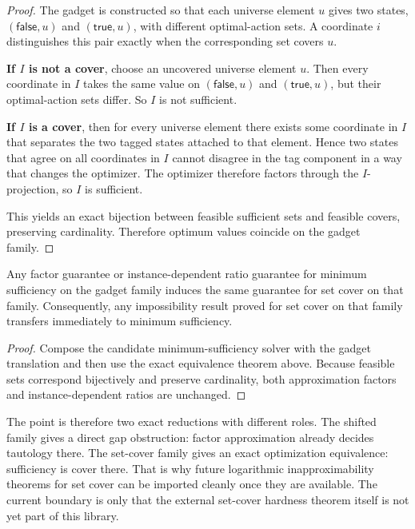 \begin{proof}
The gadget is constructed so that each universe element $u$ gives two states, $(\mathsf{false},u)$ and $(\mathsf{true},u)$, with different optimal-action sets. A coordinate $i$ distinguishes this pair exactly when the corresponding set covers $u$.

\textbf{If $I$ is not a cover}, choose an uncovered universe element $u$. Then every coordinate in $I$ takes the same value on $(\mathsf{false},u)$ and $(\mathsf{true},u)$, but their optimal-action sets differ. So $I$ is not sufficient.

\textbf{If $I$ is a cover}, then for every universe element there exists some coordinate in $I$ that separates the two tagged states attached to that element. Hence two states that agree on all coordinates in $I$ cannot disagree in the tag component in a way that changes the optimizer. The optimizer therefore factors through the $I$-projection, so $I$ is sufficient.

This yields an exact bijection between feasible sufficient sets and feasible covers, preserving cardinality. Therefore optimum values coincide on the gadget family.
\end{proof}

\begin{corollary}
Any factor guarantee or instance-dependent ratio guarantee for minimum sufficiency on the gadget family induces the same guarantee for set cover on that family. Consequently, any impossibility result proved for set cover on that family transfers immediately to minimum sufficiency.
\end{corollary}

\begin{proof}
Compose the candidate minimum-sufficiency solver with the gadget translation and then use the exact equivalence theorem above. Because feasible sets correspond bijectively and preserve cardinality, both approximation factors and instance-dependent ratios are unchanged.
\end{proof}

The point is therefore two exact reductions with different roles. The shifted family gives a direct gap obstruction: factor approximation already decides tautology there. The set-cover family gives an exact optimization equivalence: sufficiency is cover there. That is why future logarithmic inapproximability theorems for set cover can be imported cleanly once they are available. The current boundary is only that the external set-cover hardness theorem itself is not yet part of this library.
